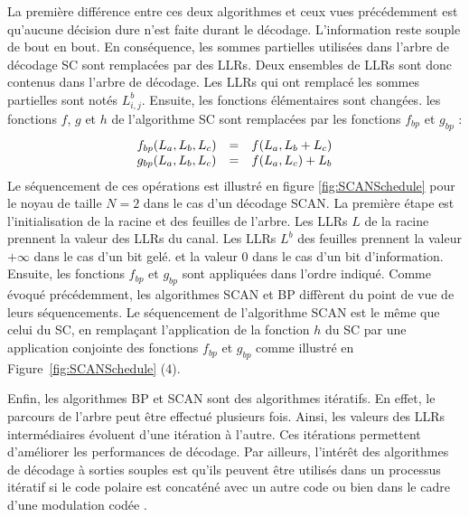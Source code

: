 La première différence entre ces deux algorithmes et ceux vues précédemment est qu'aucune décision dure n'est faite durant le décodage. L'information reste souple de bout en bout.
En conséquence, les sommes partielles utilisées dans l'arbre de décodage SC sont remplacées par des LLRs. Deux ensembles de LLRs sont donc contenus dans l'arbre de décodage. Les LLRs qui ont remplacé les sommes partielles sont notés $L^b_{i,j}$.
Ensuite, les fonctions élémentaires sont changées. les fonctions $f$, $g$ et $h$ de l'algorithme SC sont remplacées par les fonctions $f_{bp}$ et $g_{bp}$ :
\begin{eqnarray}
  \begin{array}{l c l}
    f_{bp}(L_a,L_b,L_c) & = & f(L_a, L_b  + L_c) \\
    g_{bp}(L_a,L_b,L_c) & = & f(L_a, L_c) + L_b
  \end{array}
  \label{eq:bp}
\end{eqnarray}
Le séquencement de ces opérations est illustré en figure \ref{fig:SCANSchedule} pour le noyau de taille $N=2$ dans le cas d'un décodage SCAN. La première étape est l'initialisation de la racine et des feuilles de l'arbre. Les LLRs $L$ de la racine prennent la valeur des LLRs du canal. Les LLRs $L^b$ des feuilles prennent la valeur $+\infty$ dans le cas d'un bit gelé. et la valeur $0$ dans le cas d'un bit d'information. Ensuite, les fonctions $f_{bp}$ et $g_{bp}$ sont appliquées dans l'ordre indiqué.
Comme évoqué précédemment, les algorithmes SCAN et BP diffèrent du point de vue de leurs séquencements. Le séquencement de l'algorithme SCAN est le même que celui du SC, en remplaçant l'application de la fonction $h$ du SC par une application conjointe des fonctions $f_{bp}$ et $g_{bp}$ comme illustré en Figure~\ref{fig:SCANSchedule} (4).

Enfin, les algorithmes BP et SCAN sont des algorithmes itératifs. En effet, le parcours de l'arbre peut être effectué plusieurs fois. Ainsi, les valeurs des LLRs intermédiaires évoluent d'une itération à l'autre. Ces itérations permettent d'améliorer les performances de décodage.
Par ailleurs, l'intérêt des algorithmes de décodage à sorties souples est qu'ils peuvent être utilisés dans un processus itératif si le code polaire est concaténé avec un autre code \cite{balatsoukas-stimming_polar_2017} ou bien dans le cadre d'une modulation codée \cite{dai_polar_2016}.

